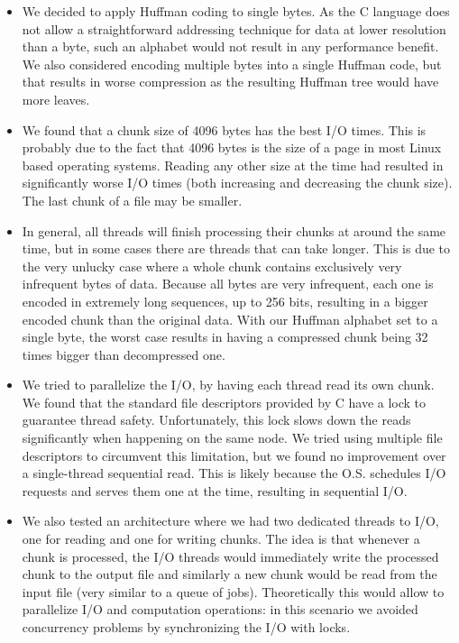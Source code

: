 \begin{itemize}
\item We decided to apply Huffman coding to single bytes. As the C language does not allow a straightforward addressing technique for data at lower resolution than a byte, such an alphabet would not result in any performance benefit. We also considered encoding multiple bytes into a single Huffman code, but that results in worse compression as the resulting Huffman tree would have more leaves.

\item We found that a chunk size of 4096 bytes has the best I/O times. This is probably due to the fact that 4096 bytes is the size of a page in most Linux based operating systems. Reading any other size at the time had resulted in significantly worse I/O times (both increasing and decreasing the chunk size). The last chunk of a file may be smaller.

\item In general, all threads will finish processing their chunks at around the same time, but in some cases there are threads that can take longer. This is due to the very unlucky case where a whole chunk contains exclusively very infrequent bytes of data. Because all bytes are very infrequent, each one is encoded in extremely long sequences, up to 256 bits, resulting in a bigger encoded chunk than the original data. With our Huffman alphabet set to a single byte, the worst case results in having a compressed chunk being 32 times bigger than decompressed one.

\item We tried to parallelize the I/O, by having each thread read its own chunk. We found that the standard file descriptors provided by C have a lock to guarantee thread safety. Unfortunately, this lock slows down the reads significantly when happening on the same node. We tried using multiple file descriptors to circumvent this limitation, but we found no improvement over a single-thread sequential read. This is likely because the O.S. schedules I/O requests and serves them one at the time, resulting in sequential I/O.

\item We also tested an architecture where we had two dedicated threads to I/O, one for reading and one for writing chunks. The idea is that whenever a chunk is processed, the I/O threads would immediately write the processed chunk to the output file and similarly a new chunk would be read from the input file (very similar to a queue of jobs). Theoretically this would allow to parallelize I/O and computation operations: in this scenario we avoided concurrency problems by synchronizing the I/O with locks.


\end{itemize}
